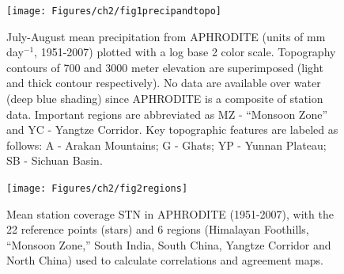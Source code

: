 \begin{figure}[t]
  \noindent\texttt{[image: Figures/ch2/fig1precipandtopo]}\\
  \caption{July-August mean precipitation from APHRODITE (units of mm day$^{-1}$, 1951-2007) plotted with a log base 2 color scale. Topography contours of 700 and 3000 meter elevation are superimposed (light and thick contour respectively). No data are available over water (deep blue shading) since APHRODITE is a composite of station data. Important regions are abbreviated as MZ - ``Monsoon Zone'' and YC - Yangtze Corridor. Key topographic features are labeled as follows: A - Arakan Mountains; G - Ghats; YP - Yunnan Plateau; SB - Sichuan Basin.}
\label{fig:f21}
\end{figure}

\begin{figure}[t]
  \noindent\texttt{[image: Figures/ch2/fig2regions]}\\
  \caption{Mean station coverage STN in APHRODITE (1951-2007), with the 22 reference points (stars) and 6 regions (Himalayan Foothills, ``Monsoon Zone,'' South India, South China, Yangtze Corridor and North China) used to calculate correlations and agreement maps.}
\label{fig:f22}
\end{figure}

